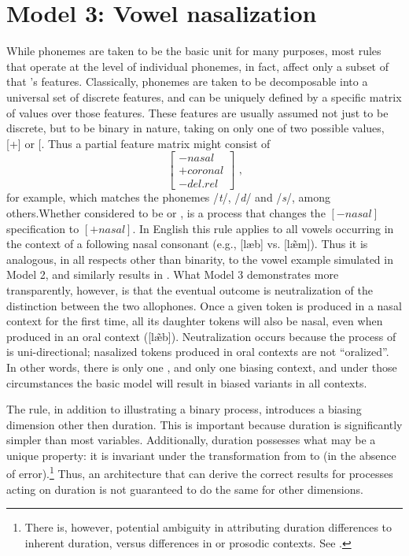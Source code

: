 \section{\label{subsec:Model-3:-Nasalization}Model 3: Vowel nasalization}

While phonemes are taken to be the basic  unit for many
purposes, most  rules that operate at the level of individual
phonemes, in fact, affect only a subset of that 's features.
Classically, phonemes are taken to be decomposable into a universal
set of discrete features, and can be uniquely defined by a specific
matrix of values over those features. These features are usually assumed
not just to be discrete, but to be binary in nature, taking on only
one of two possible values, {[}+{]} or {[}\textminus{]}. Thus a partial
feature matrix might consist of 
\[\left[\begin{array}{c}
-\textit{nasal}\\
+\textit{coronal}\\
-\textit{del.rel}
\end{array}\right]\text{ ,}\]
for example, which matches the phonemes /\emph{t}/, /\emph{d}/\emph{
}and /\emph{s}/, among others.\linebreak Whether considered to be  or
,  is a process that changes the $\left[-\textit{nasal}\right]$
specification to $\left[+\textit{nasal}\right]$. In English this rule applies
to all vowels occurring in the context of a following nasal consonant
(e.g., {[læb]} vs. {[læ̃m]}). Thus it is analogous,
in all respects other than binarity, to the vowel  example
simulated in Model 2, and similarly results in . What
Model 3 demonstrates more transparently, however, is that the eventual
outcome is neutralization of the distinction between the two allophones.
Once a given token is produced in a nasal context for the first time,
all its daughter tokens will also be nasal, even when produced in
an oral context ({[læ̃b]}). Neutralization occurs because
the process of  is uni-directional; nasalized tokens produced
in oral contexts are not ``oralized''. In other words, there is only
one , and only one biasing context, and under those circumstances
the basic  model will result in biased variants in all contexts.

The  rule, in addition to illustrating a binary process,
introduces a biasing dimension other then duration. This is important
because duration is significantly simpler than most  variables.
Additionally, duration possesses what may be a unique property: it
is invariant under the transformation from  to 
(in the absence of error).\footnote{There is, however, potential ambiguity in attributing duration differences
to inherent duration, versus differences in  or prosodic
contexts. See . } Thus, an architecture that can derive the correct results for 
processes acting on duration is not guaranteed to do the same for
other  dimensions. 

